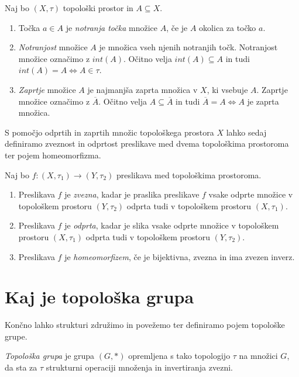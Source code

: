 \documentclass[mat1]{fmfdelo}
\newcommand{\closure}[1]{\overline{#1}}
\begin{document}
\begin{definicija}\label{def:notranjost}
Naj bo $(X, \tau)$ topološki prostor in $A \subseteq X$.
\begin{enumerate}
\item Točka $a \in A$ je \emph{notranja točka} množice $A$, če je $A$ okolica za točko $a$.
\item \emph{Notranjost} množice $A$ je množica vseh njenih notranjih točk. Notranjost množice označimo z $int(A)$. Očitno velja $int(A) \subseteq A$ in tudi $int(A) = A \iff A \in \tau$.
\item \emph{Zaprtje} množice $A$ je najmanjša zaprta množica v $X$, ki vsebuje $A$. Zaprtje množice označimo z $\closure{A}$. Očitno velja $A \subseteq \closure{A}$ in tudi $\closure{A} = A \iff A$ je zaprta množica.
\end{enumerate}
\end{definicija}

S pomočjo odprtih in zaprtih množic topološkega prostora $X$ lahko sedaj definiramo zveznost in odprtost preslikave med dvema topološkima prostoroma ter pojem homeomorfizma.

\begin{definicija}\label{def:toppreslikave}
Naj bo $f: (X, \tau_1) \to (Y, \tau_2)$ preslikava med topološkima prostoroma.
\begin{enumerate}
\item Preslikava $f$ je \emph{zvezna}, kadar je praslika preslikave $f$ vsake odprte množice v topološkem prostoru $(Y, \tau_2)$ odprta tudi v topološkem prostoru $(X, \tau_1)$.
\item Preslikava $f$ je \emph{odprta}, kadar je slika vsake odprte množice v topološkem prostoru $(X, \tau_1)$ odprta tudi v topološkem prostoru $(Y, \tau_2)$.
\item Preslikava $f$ je \emph{homeomorfizem}, če je bijektivna, zvezna in ima zvezen inverz.
\end{enumerate}
\end{definicija}

\section{Kaj je topološka grupa}


Končno lahko strukturi združimo in povežemo ter definiramo pojem topološke grupe.
\begin{definicija}\label{def:topgrupa}
\emph{Topološka grupa} je grupa $(G, *)$ opremljena s tako topologijo $\tau$ na množici $G$, da sta za $\tau$ strukturni operaciji množenja in invertiranja zvezni. 
\end{definicija}
\end{document}
